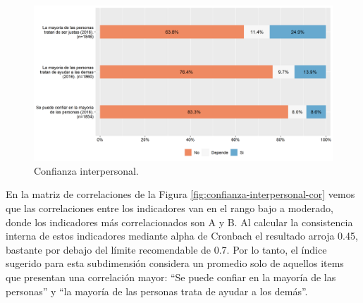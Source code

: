 \documentclass[
  12pt,
]{book}
\begin{document}
\begin{figure}[H]

{\centering \includegraphics[width=1\linewidth,height=1\textheight]{output/graphs/confianza-interpersonal} 

}

\caption{Confianza interpersonal.}\label{fig:confianza-interpersonal}
\end{figure}

En la matriz de correlaciones de la Figura \ref{fig:confianza-interpersonal-cor} vemos que las correlaciones entre los indicadores van en el rango bajo a moderado, donde los indicadores más correlacionados son A y B. Al calcular la consistencia interna de estos indicadores mediante alpha de Cronbach el resultado arroja 0.45, bastante por debajo del límite recomendable de 0.7. Por lo tanto, el índice sugerido para esta subdimensión considera un promedio solo de aquellos items que presentan una correlación mayor: ``Se puede confiar en la mayoría de las personas'' y ``la mayoría de las personas trata de ayudar a los demás''.
\end{document}
